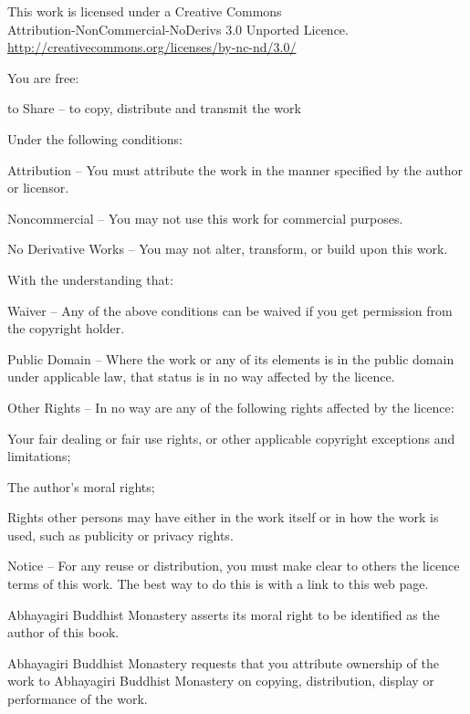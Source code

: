 
\thispagestyle{empty}

\vspace*{-2\onelineskip}
\enlargethispage{3\onelineskip}

{%
\copyrightsize\setlength{\parindent}{0pt}%
\raggedright\label{copyright-details}
\setlength{\parskip}{3pt}
{\centering

{\normalsize\ccbyncnd}

This work is licensed under a Creative Commons\\
Attribution-NonCommercial-NoDerivs 3.0 Unported Licence.\\
\href{http://creativecommons.org/licenses/by-nc-nd/3.0/}{http://creativecommons.org/licenses/by-nc-nd/3.0/}

}

You are free:
\begin{packeditemize}
  \item to Share -- to copy, distribute and transmit the work
\end{packeditemize}


Under the following conditions:

\begin{packeditemize}
\item Attribution -- You must attribute the work in the manner specified by the author or licensor.
\item Noncommercial -- You may not use this work for commercial purposes.
\item No Derivative Works -- You may not alter, transform, or build upon this work.
\end{packeditemize}

With the understanding that:

\begin{packeditemize}
    \item Waiver -- Any of the above conditions can be waived if you get permission from the copyright holder.
    \item Public Domain -- Where the work or any of its elements is in the public domain under applicable law, that status is in no way affected by the licence.
    \item Other Rights -- In no way are any of the following rights affected by the licence:
        \begin{packeditemize}
            \item Your fair dealing or fair use rights, or other applicable copyright exceptions and limitations;
            \item The author's moral rights;
            \item Rights other persons may have either in the work itself or in how the work is used, such as publicity or privacy rights.
        \end{packeditemize}
    \item Notice -- For any reuse or distribution, you must make clear to others the licence terms of this work. The best way to do this is with a link to this web page.
\end{packeditemize}

Abhayagiri Buddhist Monastery asserts its moral right to be identified as the author of this book.

Abhayagiri Buddhist Monastery requests that you attribute ownership of the work to Abhayagiri Buddhist Monastery on copying, distribution, display or performance of the work.

}
